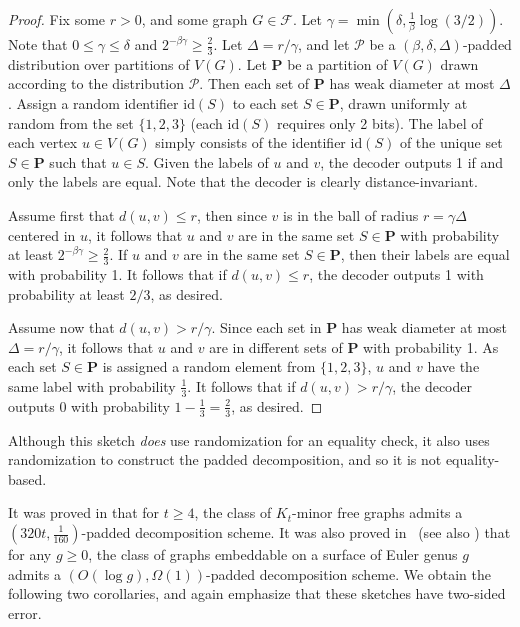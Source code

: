 \documentclass[11pt]{article}
\theoremstyle{definition}
\renewcommand{\le}{\leqslant}
\renewcommand{\ge}{\geqslant}
\def\F {{\mathcal F}}
\begin{document}
\begin{proof}
Fix some $r>0$, and some graph $G\in \F$. Let $\gamma=
\min(\delta,\tfrac{1}{\beta}\log(3/2))$. Note that $0\le \gamma\le
\delta$ and $2^{-\beta \gamma}\ge \tfrac23$. Let $\Delta=r/\gamma$,
and let $\mathcal{P}$ be a $(\beta,\delta,\Delta)$-padded distribution over partitions of
$V(G)$. Let $\mathbf{P}$ be a partition of $V(G)$ drawn according to
the distribution $\mathcal{P}$. Then each set of $\mathbf{P}$ has weak
diameter at most $\Delta$. Assign a random identifier
$\text{id}(S)$ to each set $S\in \mathbf{P}$, drawn uniformly at
random from the set $\{1,2,3\}$ (each $\text{id}(S)$ requires only 2 bits). The label of each vertex $u\in V(G)$ simply consists of the identifier
$\text{id}(S)$ of the unique set $S\in \mathbf{P}$ such that $u\in
S$. Given the labels of $u$ and $v$, the decoder outputs 1 if and
only the labels are equal. Note that the decoder is clearly distance-invariant.

Assume first that $d(u,v)\le r$, then since $v$ is in
the ball of radius $r=\gamma \Delta$ centered in $u$, it follows that $u$
and $v$ are in the same set $S\in \mathbf{P}$ with probability at
least $2^{-\beta \gamma}\ge \tfrac23$. If $u$
and $v$ are in the same set $S\in \mathbf{P}$, then their labels are
equal with probability 1. It follows that if $d(u,v)\le r$, the
decoder outputs 1
with probability at least $2/3$, as desired.

Assume now that $d(u,v)> r/\gamma$. Since each set in $\mathbf{P}$ has weak
diameter at most $\Delta=r/\gamma$, it follows that $u$ and $v$ are in different sets of
$\mathbf{P}$ with probability 1. As each set $S\in \mathbf{P}$
is assigned a random element from $\{1,2,3\}$, $u$ and $v$ have the
same label with probability $\tfrac13$. It follows that if $d(u,v)>
r/\gamma$, the decoder outputs 0 with probability
$1-\tfrac13=\tfrac23$, as desired.
\end{proof}

Although this sketch \emph{does} use randomization for an equality check, it also uses randomization
to construct the padded decomposition, and so it is not equality-based.

 

It was proved in \cite{AGGNT19} that for $t\ge 4$, the class of  $K_t$-minor free graphs admits a
$(320t, \tfrac1{160})$-padded decomposition scheme. It was also proved in~\cite{LS10} (see also
\cite{AGGNT19}) that for any $g\ge 0$, the class of graphs embeddable on a surface of Euler genus
$g$ admits a $(O(\log g), \Omega(1))$-padded decomposition scheme. We obtain the following two
corollaries, and again emphasize that these sketches have two-sided error.
\end{document}

